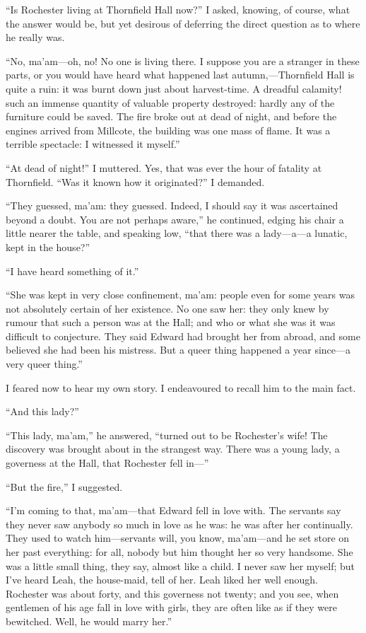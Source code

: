 \enquote{Is \Mr{} Rochester living at Thornfield Hall now?} I asked,
knowing, of course, what the answer would be, but yet desirous of
deferring the direct question as to where he really was.

\enquote{No, ma'am---oh, no! No one is living there. I suppose you are
a stranger in these parts, or you would have heard what happened last
autumn,---Thornfield Hall is quite a ruin: it was burnt down just about
harvest-time. A dreadful calamity! such an immense quantity of valuable
property destroyed: hardly any of the furniture could be saved. The
fire broke out at dead of night, and before the engines arrived from
Millcote, the building was one mass of flame. It was a terrible
spectacle: I witnessed it myself.}

\enquote{At dead of night!} I muttered. Yes, that was ever the hour of
fatality at Thornfield. \enquote{Was it known how it originated?} I
demanded.

\enquote{They guessed, ma'am: they guessed. Indeed, I should say it was
ascertained beyond a doubt. You are not perhaps aware,} he continued,
edging his chair a little nearer the table, and speaking low,
\enquote{that there was a lady---a---a lunatic, kept in the house?}

\enquote{I have heard something of it.}

\enquote{She was kept in very close confinement, ma'am: people even for
some years was not absolutely certain of her existence. No one saw her:
they only knew by rumour that such a person was at the Hall; and who or
what she was it was difficult to conjecture. They said \Mr{} Edward had
brought her from abroad, and some believed she had been his mistress. 
But a queer thing happened a year since---a very queer thing.}

I feared now to hear my own story. I endeavoured to recall him to the
main fact.

\enquote{And this lady?}

\enquote{This lady, ma'am,} he answered, \enquote{turned out to be \Mr{}
 Rochester's wife! The discovery was brought about in the strangest
way. There was a young lady, a governess at the Hall, that \Mr{}
 Rochester fell in---}

\enquote{But the fire,} I suggested.

\enquote{I'm coming to that, ma'am---that \Mr{} Edward fell in love with. 
The servants say they never saw anybody so much in love as he was: he
was after her continually. They used to watch him---servants will, you
know, ma'am---and he set store on her past everything: for all, nobody
but him thought her so very handsome. She was a little small thing,
they say, almost like a child. I never saw her myself; but I've heard
Leah, the house-maid, tell of her. Leah liked her well enough. \Mr{}
 Rochester was about forty, and this governess not twenty; and you see,
when gentlemen of his age fall in love with girls, they are often like
as if they were bewitched. Well, he would marry her.}

